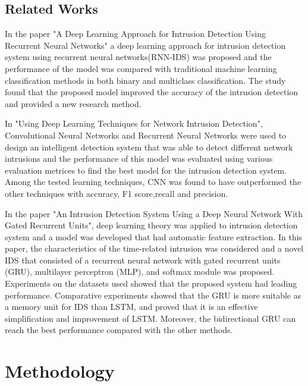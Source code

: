 \section{Related Works}
\vspace{-18pt}
In the paper "A Deep Learning Approach for Intrusion Detection Using Recurrent Neural Networks" a deep learning approach for intrusion detection system using recurrent neural networks(RNN-IDS) was proposed and the performance of the model was compared with traditional machine learning classification methods in both binary and multiclass classification. The study found that the proposed model improved the accuracy of the intrusion detection and provided a new research method.\cite{yin2017deep}
\par 
In "Using Deep Learning Techniques for Network Intrusion Detection", Convolutional Neural Networks and Recurrent Neural Networks were used to design an intelligent detection system that was able to detect different network intrusions and the performance of this model was evaluated using various evaluation metrices to find the best model for the intrusion detection system. Among the tested learning techniques, CNN was found to have outperformed the other techniques with accuracy, F1 score,recall and precision.\cite{al2020using}
\par 
In the paper "An Intrusion Detection System Using a Deep Neural Network With Gated Recurrent Units", deep learning theory was applied to intrusion detection system and a model was developed that had automatic feature extraction. In this paper, the characteristics of the time-related intrusion was considered and a novel IDS that consisted of a recurrent neural network with gated recurrent units (GRU), multilayer perceptron (MLP), and softmax module was proposed. Experiments on the datasets used showed that the proposed system had leading performance. Comparative experiments showed that the GRU is more suitable as a memory unit for IDS than LSTM, and proved that it is an effective simplification and improvement of LSTM. Moreover, the bidirectional GRU can reach the best performance compared with the other methods.\cite{xu2018intrusion}
\chapter{Methodology}
\vspace{-18pt}
